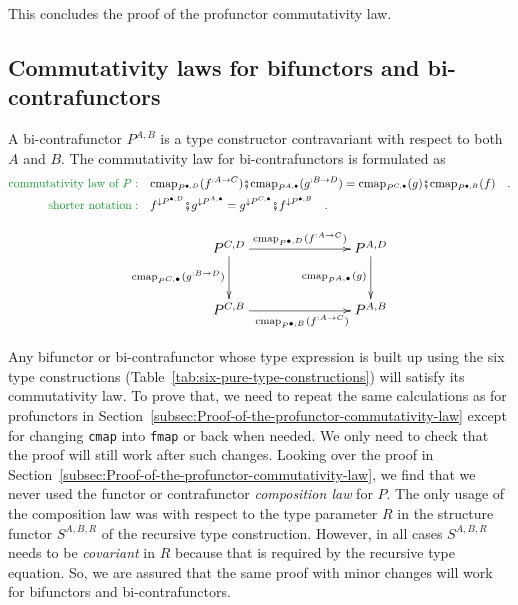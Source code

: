 This concludes the proof of the profunctor commutativity law.

\subsection{Commutativity laws for bifunctors and bi-contrafunctors\label{subsec:Proofs-of-commutativity-for-bifunctor}}

A bi-contrafunctor $P^{A,B}$ is a type constructor contravariant
with respect to both $A$ and $B$. The commutativity law for bi-contrafunctors
is formulated as 
\begin{align}
{\color{greenunder}\text{commutativity law of }P:}\quad & \text{cmap}_{P^{\bullet,D}}(f^{:A\rightarrow C})\bef\text{cmap}_{P^{A,\bullet}}(g^{:B\rightarrow D})=\text{cmap}_{P^{C,\bullet}}(g)\bef\text{cmap}_{P^{\bullet,B}}(f)\quad.\nonumber \\
{\color{greenunder}\text{shorter notation}:}\quad & f^{\downarrow P^{\bullet,D}}\bef g^{\downarrow P^{A,\bullet}}=g^{\downarrow P^{C,\bullet}}\bef f^{\downarrow P^{\bullet,B}}\quad.\label{eq:bi-contrafunctor-commutativity-law}
\end{align}

\begin{wrapfigure}{l}{0.43\columnwidth}%
\vspace{-1.7\baselineskip}
\[
\xymatrix{\xyScaleY{2.5pc}\xyScaleX{6.0pc}P^{C,D}\ar[r]\sp(0.55){\text{cmap}_{P^{\bullet,D}}(f^{:A\rightarrow C})~~~}\ar[d]\sb(0.45){\text{cmap}_{P^{C,\bullet}}(g^{:B\rightarrow D})} & P^{A,D}\ar[d]\sb(0.45){\text{cmap}_{P^{A,\bullet}}(g)}\\
P^{C,B}\ar[r]\sb(0.45){~~~~\text{cmap}_{P^{\bullet,B}}(f^{:A\rightarrow C})} & P^{A,B}
}
\]

\vspace{-1.7\baselineskip}
\end{wrapfigure}%

Any bifunctor or bi-contrafunctor whose type expression is built up
using the six type constructions (Table~\ref{tab:six-pure-type-constructions})
will satisfy its commutativity law. To prove that, we need to repeat
the same calculations as for profunctors in Section~\ref{subsec:Proof-of-the-profunctor-commutativity-law}
except for changing \lstinline!cmap! into \lstinline!fmap! or back
when needed. We only need to check that the proof will still work
after such changes. Looking over the proof in Section~\ref{subsec:Proof-of-the-profunctor-commutativity-law},
we find that we never used the functor or contrafunctor \emph{composition
law} for $P$. The only usage of the composition law was with respect
to the type parameter $R$ in the structure functor $S^{A,B,R}$ of
the recursive type construction. However, in all cases $S^{A,B,R}$
needs to be \emph{covariant} in $R$ because that is required by the
recursive type equation. So, we are assured that the same proof with
minor changes will work for bifunctors and bi-contrafunctors.

